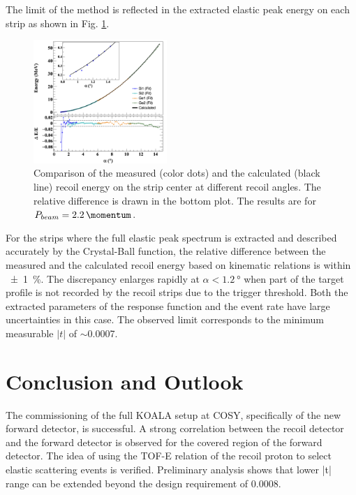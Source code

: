 \documentclass[number,5p]{elsarticle}
\begin{document}
The limit of the method is reflected in the extracted elastic peak energy on each strip as shown in
Fig. \ref{fig:measured_vs_calculated}.
\begin{figure}[tb!]
  \centering
  \includegraphics[width=0.45\textwidth]{./e_vs_alpha_combined.png}
  \caption{
    Comparison of the measured (color dots) and the calculated (black line)
    recoil energy on the strip center at different recoil angles. The relative
    difference is drawn in the bottom plot. The results are for $P_{beam} = \SI{2.2}{\momentum}$.}
  \label{fig:measured_vs_calculated}
\end{figure}
For the strips where the full elastic peak spectrum is extracted and described accurately
by the Crystal-Ball function, the relative difference between the measured and
the calculated recoil energy based on kinematic relations is within \SI{\pm 1}{\percent}.
The discrepancy enlarges rapidly at $\alpha < \SI{1.2}{\degree}$ when part of
the target profile is not recorded by the recoil strips due to the trigger threshold.
Both the extracted parameters of the response function and the event rate have large uncertainties in this case.
The observed limit corresponds to the minimum measurable $|t|$ of $\sim$\SI{0.0007}{\tmom}.

\section{Conclusion and Outlook}
\label{sec:conclusion}

The commissioning of the full KOALA setup at COSY, specifically of the new forward detector, is successful.
A strong correlation between the recoil detector and the forward detector is
observed for the covered region of the forward detector.
The idea of using the TOF-E relation of the recoil proton to select elastic
scattering events is verified.
Preliminary analysis shows that lower |t| range can be extended beyond the design
requirement of \SI{0.0008}{\tmom}.
\end{document}
